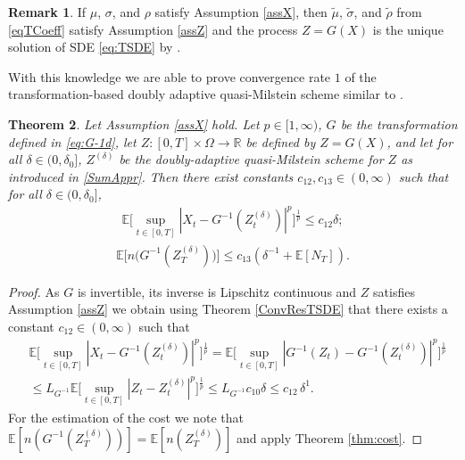 \documentclass[11pt,a4paper]{article}
\numberwithin{equation}{section}
\newtheorem{theorem}{Theorem}[section]
\theoremstyle{definition}
\newtheorem{remark}[theorem]{Remark}
\newcommand{\E}{{\mathbb{E}}}
\newcommand{\R}{{\mathbb{R}}}
\begin{document}
\begin{remark}
    If $\mu$, $\sigma$, and $\rho$ satisfy Assumption \ref{assX}, then $\widetilde \mu$, $\widetilde\sigma$, and $\widetilde\rho$ from \eqref{eqTCoeff} satisfy Assumption \ref{assZ} and the process $Z=G(X)$ is the unique solution of SDE \eqref{eq:TSDE} by \cite[Lemma 4.2 and Lemma 4.3]{PSS2024JMS}.
\end{remark}

With this knowledge we are able to prove convergence rate $1$ of the transformation-based doubly adaptive quasi-Milstein scheme similar to \cite[Theorem 4.4]{PSS2024JMS}.

\begin{theorem}\label{MainWeakAss}
Let Assumption \ref{assX} hold. Let $p\in[1,\infty)$, $G$ be the transformation defined in \eqref{eq:G-1d}, let $Z\colon[0,T]\times\Omega\to \R$ be defined by $Z = G(X)$, and let for all $\delta\in(0,\delta_0]$, $Z^{(\delta)}$ be the doubly-adaptive quasi-Milstein scheme for $Z$ as introduced in \eqref{SumAppr}.
Then there exist constants $c_{12}, c_{13} \in(0,\infty)$ such that for all $\delta\in(0,\delta_0]$,
\begin{equation}
    \begin{aligned}
    \E\Big[ \sup_{t\in[0,T]} |X_t- G^{-1}(Z^{(\delta)}_t) |^p\Big]^\frac{1}{p} \leq c_{12} \delta;
    \end{aligned}
\end{equation}
\begin{equation}
    \begin{aligned}
        \E\Big[n\big(G^{-1}(Z^{(\delta)}_T)\big)\Big]\leq c_{13}(\delta^{-1}+\E[N_T]).
    \end{aligned}
\end{equation}
\end{theorem}

\begin{proof}
As $G$ is invertible, its inverse is Lipschitz continuous and $Z$ satisfies Assumption \ref{assZ} we obtain using Theorem \ref{ConvResTSDE} that there exists a constant $c_{12}\in(0,\infty)$ such that
\begin{equation}
    \begin{aligned}
    &\E\Big[ \sup_{t\in[0,T]} |X_t- G^{-1}(Z^{(\delta)}_t) |^p\Big]^\frac{1}{p}
    = \E\Big[ \sup_{t\in[0,T]} |G^{-1}(Z_t) - G^{-1}(Z^{(\delta)}_t) |^p\Big]^\frac{1}{p} \\
    &\leq L_{G^{-1}} \E\Big[ \sup_{t\in[0,T]} |Z_t - Z^{(\delta)}_t|^p\Big]^\frac{1}{p} 
    \leq L_{G^{-1}} c_{10} \delta 
    \leq c_{12}\, \delta^1.
    \end{aligned}
\end{equation}
For the estimation of the cost we note that $\E[n(G^{-1}(Z^{(\delta)}_T))] = \E[n(Z^{(\delta)}_T)]$ and apply Theorem \ref{thm:cost}.
\end{proof}
\end{document}
